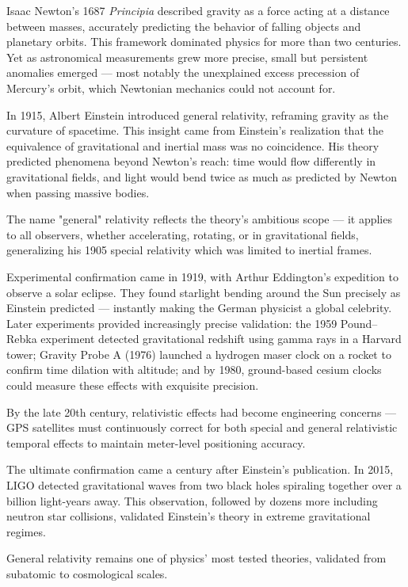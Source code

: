 \begin{historical}
Isaac Newton's 1687 \textit{Principia} described gravity as a force acting at a distance between masses, accurately predicting the behavior of falling objects and planetary orbits. This framework dominated physics for more than two centuries. Yet as astronomical measurements grew more precise, small but persistent anomalies emerged — most notably the unexplained excess precession of Mercury's orbit, which Newtonian mechanics could not account for.

In 1915, Albert Einstein introduced general relativity, reframing gravity as the curvature of spacetime. This insight came from Einstein's realization that the equivalence of gravitational and inertial mass was no coincidence. His theory predicted phenomena beyond Newton's reach: time would flow differently in gravitational fields, and light would bend twice as much as predicted by Newton when passing massive bodies.

The name "general" relativity reflects the theory's ambitious scope — it applies to all observers, whether accelerating, rotating, or in gravitational fields, generalizing his 1905 special relativity which was limited to inertial frames.

Experimental confirmation came in 1919, with Arthur Eddington's expedition to observe a solar eclipse. They found starlight bending around the Sun precisely as Einstein predicted — instantly making the German physicist a global celebrity. Later experiments provided increasingly precise validation: the 1959 Pound–Rebka experiment detected gravitational redshift using gamma rays in a Harvard tower; Gravity Probe A (1976) launched a hydrogen maser clock on a rocket to confirm time dilation with altitude; and by 1980, ground-based cesium clocks could measure these effects with exquisite precision.

By the late 20th century, relativistic effects had become engineering concerns — GPS satellites must continuously correct for both special and general relativistic temporal effects to maintain meter-level positioning accuracy.

The ultimate confirmation came a century after Einstein's publication. In 2015, LIGO detected gravitational waves from two black holes spiraling together over a billion light-years away. This observation, followed by dozens more including neutron star collisions, validated Einstein's theory in extreme gravitational regimes.

General relativity remains one of physics' most tested theories, validated from subatomic to cosmological scales.
\end{historical}
